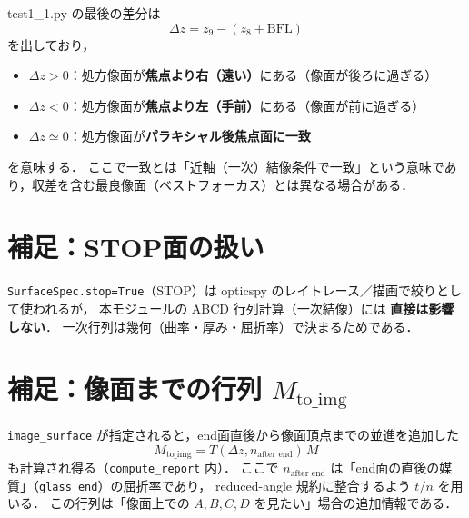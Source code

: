 \documentclass[a4paper,11pt]{jsarticle} %
\begin{document}
test1\_1.py の最後の差分は
\[
\Delta z
=
z_9 - (z_8+\mathrm{BFL})
\]
を出しており，
\begin{itemize}
  \item $\Delta z>0$：処方像面が\textbf{焦点より右（遠い）}にある（像面が後ろに過ぎる）
  \item $\Delta z<0$：処方像面が\textbf{焦点より左（手前）}にある（像面が前に過ぎる）
  \item $\Delta z\simeq 0$：処方像面が\textbf{パラキシャル後焦点面に一致}
\end{itemize}
を意味する．
ここで一致とは「近軸（一次）結像条件で一致」という意味であり，収差を含む最良像面（ベストフォーカス）とは異なる場合がある．

\section{補足：STOP面の扱い}
\texttt{SurfaceSpec.stop=True}（STOP）は opticspy のレイトレース／描画で絞りとして使われるが，
本モジュールの AB​CD 行列計算（一次結像）には \textbf{直接は影響しない}．
一次行列は幾何（曲率・厚み・屈折率）で決まるためである．

\section{補足：像面までの行列 $M_{\mathrm{to\_img}}$}
\texttt{image\_surface} が指定されると，end面直後から像面頂点までの並進を追加した
\[
M_{\mathrm{to\_img}} = T(\Delta z, n_{\text{after end}})\,M
\]
も計算され得る（\texttt{compute\_report} 内）．
ここで $n_{\text{after end}}$ は「end面の直後の媒質」（\texttt{glass\_end}）の屈折率であり，
reduced-angle 規約に整合するよう $t/n$ を用いる．
この行列は「像面上での $A,B,C,D$ を見たい」場合の追加情報である．


\end{document}
